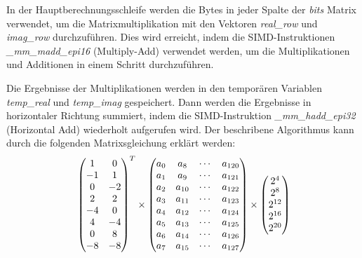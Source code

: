 \documentclass[course=erap]{aspdoc}
\begin{document}
    In der Hauptberechnungsschleife werden die Bytes in jeder Spalte der \textit{bits} Matrix verwendet, um die Matrixmultiplikation mit den Vektoren \textit{real\_row} und \textit{imag\_row} durchzuführen. Dies wird erreicht, indem die SIMD-Instruktionen \textit{\_mm\_madd\_epi16} (Multiply-Add) verwendet werden, um die Multiplikationen und Additionen in einem Schritt durchzuführen.

    Die Ergebnisse der Multiplikationen werden in den temporären Variablen \textit{temp\_real} und \textit{temp\_imag} gespeichert. Dann werden die Ergebnisse in horizontaler Richtung summiert, indem  die SIMD-Instruktion \textit{\_mm\_hadd\_epi32} (Horizontal Add) wiederholt aufgerufen wird.
    \newpage
    Der beschribene Algorithmus kann durch die folgenden Matrixsgleichung erklärt werden:
    \[
        \newline
        \begin{pmatrix}
            1 & 0 \\
            -1 & 1 \\
            0 & -2 \\
            2 & 2 \\
            -4 & 0 \\
            4 & -4 \\
            0 & 8 \\
            -8 & -8
        \end{pmatrix}
        ^{T}
        \times
        \begin{pmatrix}
            a_0 & a_8 & \cdots & a_{120} \\
            a_1 & a_9 & \cdots & a_{121} \\
            a_2 & a_{10} & \cdots & a_{122} \\
            a_3 & a_{11} & \cdots & a_{123} \\
            a_4 & a_{12} & \cdots & a_{124} \\
            a_5 & a_{13} & \cdots & a_{125} \\
            a_6 & a_{14} & \cdots & a_{126} \\
            a_7 & a_{15} & \cdots & a_{127}
        \end{pmatrix}
        \times
        \begin{pmatrix}
            2^4 \\
            2^8 \\
            2^{12} \\
            2^{16} \\
            2^{20} \\

\end{pmatrix}\]
\end{document}
